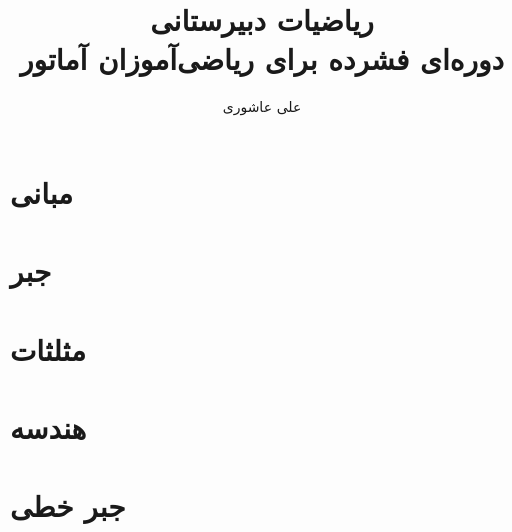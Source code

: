 \documentclass[a4paper,12pt,twoside]{book}
\begin{document}
	
	\author{علی عاشوری}
	\title{
		{\Huge \textcolor{RoyalPurple}{\textbf{ریاضیات دبیرستانی}}}
		\\ \bigskip \smallskip
		{\normalsize دوره‌ای فشرده برای ریاضی‌آموزان آماتور}
		}
	
	
	\frontmatter
	\maketitle
	\pagestyle{empty}
	\tableofcontents
	
	
	\pagestyle{fancy}
	
	\mainmatter
	\part{مبانی}
	
	
	
	
	
	\part{جبر}
	
	
	
	
	
	
	\part{مثلثات}
	
	
	
	\part{هندسه}
	
	
	
	
	\part{جبر خطی}
	
	
	
\end{document}
